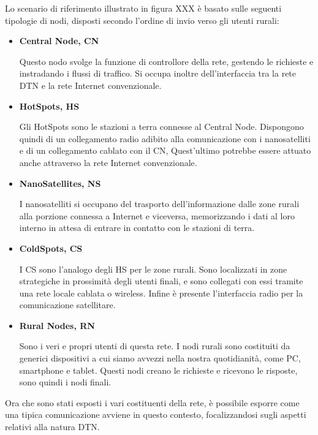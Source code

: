 \documentclass[12pt,a4paper,oneside]{book}
\begin{document}
		Lo scenario di riferimento illustrato in figura XXX è basato sulle seguenti tipologie di nodi, disposti secondo l'ordine di invio verso gli utenti rurali:
		\begin{itemize}
			\item {\bf Central Node, CN}
			
			Questo nodo svolge la funzione di controllore della rete, gestendo le richieste e instradando i flussi di traffico. Si occupa inoltre dell'interfaccia tra la rete DTN e la rete Internet convenzionale.
			
			\item {\bf HotSpots, HS}
			
			Gli HotSpots sono le stazioni a terra connesse al Central Node. Dispongono quindi di un collegamento radio adibito alla comunicazione con i nanosatelliti e di un collegamento cablato con il CN, Quest'ultimo potrebbe essere attuato anche attraverso la rete Internet convenzionale. 
			
			\item {\bf NanoSatellites, NS}
			
			I nanosatelliti si occupano del trasporto dell'informazione dalle zone rurali alla porzione connessa a Internet e viceversa, memorizzando i dati al loro interno in attesa di entrare in contatto con le stazioni di terra.
			
			\item {\bf ColdSpots, CS}
			
			I CS sono l'analogo degli HS per le zone rurali. Sono localizzati in zone strategiche in prossimità degli utenti finali, e sono collegati con essi tramite una rete locale cablata o wireless. Infine è presente l'interfaccia radio per la comunicazione satellitare.
			
			\item {\bf Rural Nodes, RN}
			
			Sono i veri e propri utenti di questa rete. I nodi rurali sono costituiti da generici dispositivi a cui siamo avvezzi nella nostra quotidianità, come PC, smartphone e tablet. Questi nodi creano le richieste e ricevono le risposte, sono quindi i nodi finali.  
						
		\end{itemize}
		
		Ora che sono stati esposti i vari costituenti della rete, è possibile esporre come una tipica comunicazione avviene in questo contesto, focalizzandosi sugli aspetti relativi alla natura DTN. 
		
\end{document}
